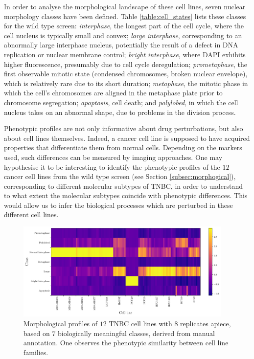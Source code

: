 In order to analyse the morphological landscape of these cell lines, seven nuclear morphology classes have been defined. Table \ref{table:cell_states} lists these classes for the wild type screen: \emph{interphase}, the longest part of the cell cycle, where the cell nucleus is typically small and convex; \emph{large interphase}, corresponding to an abnormally large interphase nucleus, potentially the result of a defect in DNA replication or nuclear membrane control; \emph{bright interphase}, where DAPI exhibits higher fluorescence, presumably due to cell cycle deregulation; \emph{prometaphase}, the first observable mitotic state (condensed chromosomes, broken nuclear envelope), which is relatively rare due to its short duration; \emph{metaphase}, the mitotic phase in which the cell's chromosomes are aligned in the metaphase plate prior to chromosome segregation; \emph{apoptosis}, cell death; and \emph{polylobed}, in which the cell nucleus takes on an abnormal shape, due to problems in the division process.

Phenotypic profiles are not only informative about drug perturbations, but also about cell lines themselves. Indeed, a cancer cell line is supposed to have acquired properties that differentiate them from normal cells. Depending on the markers used, such differences can be measured by imaging approaches. One may hypothesise it to be interesting to identify the phenotypic profiles of the $12$ cancer cell lines from the wild type screen (see Section \ref{subsec:morphogical}), corresponding to different molecular subtypes of TNBC, in order to understand to what extent the molecular subtypes coincide with phenotypic differences. This would allow us to infer the biological processes which are perturbed in these different cell lines.

\begin{figure}[h!]
\centering
\includegraphics[width=0.95\textwidth]{img/profile.pdf}
\caption{Morphological profiles of $12$ TNBC cell lines with $8$ replicates apiece, based on $7$ biologically meaningful classes, derived from manual annotation. One observes the phenotypic similarity between cell line families.}
\label{fig:morphological_profiles}
\end{figure}

